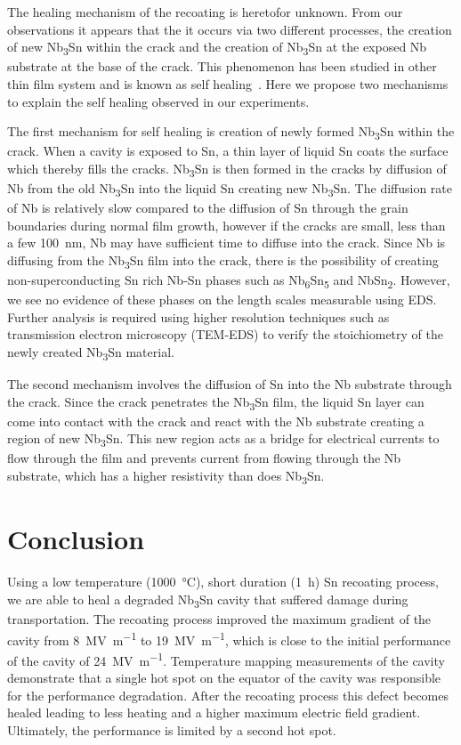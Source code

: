 The healing mechanism of the recoating is heretofor unknown. From our observations it appears that the it occurs via two different processes, the creation of new Nb\textsubscript{3}Sn within the crack and the creation of Nb\textsubscript{3}Sn at the exposed Nb substrate at the base of the crack. This phenomenon has been studied in other thin film system and is known as self healing~\cite{Sloof2007}. Here we propose two mechanisms to explain the self healing observed in our experiments. 

The first mechanism for self healing is creation of newly formed Nb\textsubscript{3}Sn within the crack. When a cavity is exposed to Sn, a thin layer of liquid Sn coats the surface which thereby fills the cracks. Nb\textsubscript{3}Sn is then formed in the cracks by diffusion of Nb from the old Nb\textsubscript{3}Sn into the liquid Sn creating new Nb\textsubscript{3}Sn. The diffusion rate of Nb is relatively slow compared to the diffusion of Sn through the grain boundaries during normal film growth, however if the cracks are small, less than a few \qty{100}{nm}, Nb may have sufficient time to diffuse into the crack. Since Nb is diffusing from the Nb\textsubscript{3}Sn film into the crack, there is the possibility of creating non-superconducting Sn rich Nb-Sn phases such as Nb\textsubscript{6}Sn\textsubscript{5} and NbSn\textsubscript{2}. However, we see no evidence of these phases on the length scales measurable using EDS. Further analysis is required using higher resolution techniques such as transmission electron microscopy (TEM-EDS) to verify the stoichiometry of the newly created Nb\textsubscript{3}Sn material.

The second mechanism involves the diffusion of Sn into the Nb substrate through the crack. Since the crack penetrates the Nb\textsubscript{3}Sn film, the liquid Sn layer can come into contact with the crack and react with the Nb substrate creating a region of new Nb\textsubscript{3}Sn. This new region acts as a bridge for electrical currents to flow through the film and prevents current from flowing through the Nb substrate, which has a higher resistivity than does Nb\textsubscript{3}Sn. 


\section{Conclusion}
\label{sec:Conclusion}

Using a low temperature (\qty{1000}{\degreeCelsius}), short duration (\qty{1}{\hour}) Sn recoating process, we are able to heal a degraded Nb\textsubscript{3}Sn cavity that suffered damage during transportation. The recoating process improved the maximum gradient of the cavity from \qty{8}{\mega\volt\per\meter} to \qty{19}{\mega\volt\per\meter}, which is close to the initial performance of the cavity of \qty{24}{\mega\volt\per\meter}. Temperature mapping measurements of the cavity demonstrate that a single hot spot on the equator of the cavity was responsible for the performance degradation. After the recoating process this defect becomes healed leading to less heating and a higher maximum electric field gradient. Ultimately, the performance is limited by a second hot spot.

